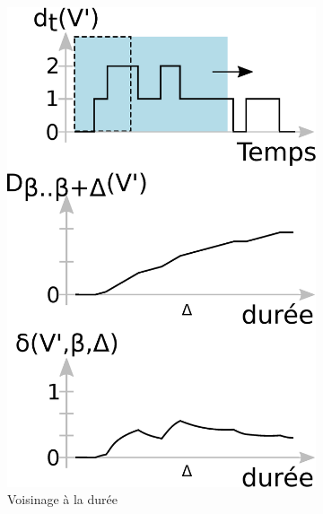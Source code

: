 \begin{figure}
\centering
	\begin{subfigure}{0.4\textwidth}
		\centering
		\includegraphics[width=0.8\linewidth]{img/GroupeDense/duration.eps}
		\caption{Voisinage à la durée}
		\label{fig:calcul_var_dure}
	\end{subfigure}\hspace*{0.05\textwidth}
	\begin{subfigure}{0.4\textwidth}
		\centering

\end{subfigure}
\end{figure}

